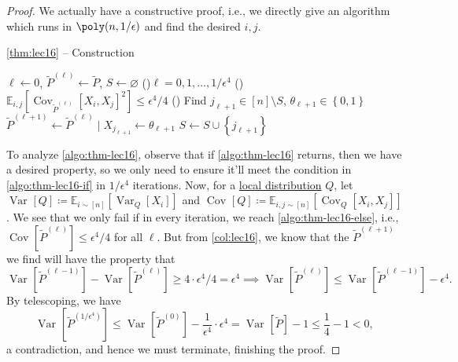 \begin{proof}
	We actually have a constructive proof, i.e., we directly give an algorithm which runs in \(\poly(n, 1 / \epsilon )\) and find the desired \(i, j\).

	\begin{algorithm}[H]\label{algo:thm-lec16}
		\DontPrintSemicolon
		\caption{\autoref{thm:lec16} -- Construction}
		\BlankLine
		\(\ell \gets 0\), \(\widetilde{P} ^{(\ell )}\gets \widetilde{P} \), \(S\gets \varnothing \)\;
		\For(){\(\ell = 0, 1, \ldots  , 1 / \epsilon ^4\) }{
			\uIf(\label{algo:thm-lec16-if}){\(\mathbb{E}_{i, j}\left[\mathop{\mathrm{Cov}}\nolimits_{\widetilde{P} ^{(\ell )}}\left[X_i, X_j \right] ^{2} \right] \leq \epsilon ^4 / 4\)}{
			}\Else(\label{algo:thm-lec16-else}){
				Find \(j_{\ell +1}\in [n]\setminus S\), \(\theta _{\ell +1}\in \left\{ 0, 1 \right\} \) 
				\(\widetilde{P} ^{(\ell +1)}\gets \widetilde{P} ^{(\ell )}\mid X_{j_{\ell +1}}\gets \theta _{\ell +1}\)\;
				\(S\gets S \cup \left\{ j _{\ell +1}\right\} \)\;
			}
		}
	\end{algorithm}
	To analyze \autoref{algo:thm-lec16}, observe that if \autoref{algo:thm-lec16} returns, then we have a desired property, so we only need to ensure it'll meet the condition in \autoref{algo:thm-lec16-if} in \(1 / \epsilon ^4\) iterations. Now, for a \hyperref[def:local-distribution]{local distribution} \(Q\), let \(\mathop{\mathrm{Var}}\nolimits_{}\left[Q \right] \coloneqq \mathbb{E}_{i\sim [n]}\left[\mathop{\mathrm{Var}}\nolimits_{Q}\left[X_i \right]  \right] \) and \(\mathop{\mathrm{Cov}}\nolimits_{}\left[Q \right] \coloneqq \mathbb{E}_{i, j\sim [n]}\left[\mathop{\mathrm{Cov}}\nolimits_{Q}\left[X_i, X_j \right]  \right] \). We see that we only fail if in every iteration, we reach \autoref{algo:thm-lec16-else}, i.e., \(\mathop{\mathrm{Cov}}\nolimits_{}[ \widetilde{P} ^{(\ell )}] \leq \epsilon ^4 / 4\) for all \(\ell \). But from \autoref{col:lec16}, we know that the \(\widetilde{P} ^{(\ell +1)}\) we find will have the property that
	\[
		\mathop{\mathrm{Var}}\nolimits_{}[\widetilde{P} ^{(\ell -1 )} ] - \mathop{\mathrm{Var}}\nolimits_{}[\widetilde{P} ^{(\ell)}] \geq 4\cdot \epsilon ^4 / 4 = \epsilon ^4
		\implies \mathop{\mathrm{Var}}\nolimits_{}[ \widetilde{P} ^{(\ell )} ] \leq \mathop{\mathrm{Var}}\nolimits_{}[ \widetilde{P} ^{(\ell -1)}] - \epsilon ^4.
	\]
	By telescoping, we have
	\[
		\mathop{\mathrm{Var}}\nolimits_{}[ \widetilde{P} ^{(1 / \epsilon ^4)} ]
		\leq \mathop{\mathrm{Var}}\nolimits_{}[ \widetilde{P}^{(0)} ] - \frac{1}{\epsilon ^4}\cdot \epsilon ^4
		= \mathop{\mathrm{Var}}\nolimits_{}[ \widetilde{P} ] - 1
		\leq \frac{1}{4} - 1 < 0,
	\]
	a contradiction, and hence we must terminate, finishing the proof.
\end{proof}

